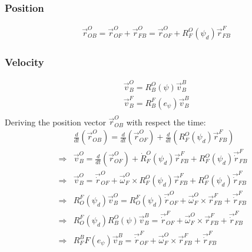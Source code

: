 \documentclass[12pt]{article}
\begin{document}
            
        \subsubsection{Position}
            \begin{equation}
                \begin{aligned}
                    & \vec{r}_{OB}^O = \vec{r}_{OF}^O + \vec{r}_{FB}^O = \vec{r}_{OF}^O + R_F^O(\psi_d) \vec{r}_{FB}^F
                \end{aligned}
            \end{equation}


        \subsubsection{Velocity}
            \begin{equation}
                \begin{aligned}
                    & \vec{v}_B^O = R_B^O(\psi) \vec{v}_B^B \\
                    & \vec{v}_B^F = R_B^F(e_{\psi}) \vec{v}_B^B \\
                \end{aligned}
            \end{equation}
            Deriving the position vector $\vec{r}_{OB}^O$ with respect the time: 
            \begin{equation}
                \begin{aligned}
                    & \frac{d}{dt}(\vec{r}_{OB}^O) = \frac{d}{dt}(\vec{r}_{OF}^O) + \frac{d}{dt}(R_F^O(\psi_d) \vec{r}_{FB}^F) \\
                    \Rightarrow & \vec{v}_B^O = \frac{d}{dt}(\vec{r}_{OF}^O) + \dot{R}_F^O(\psi_d) \vec{r}_{FB}^F + R_F^O(\psi_d) \vec{\dot{r}}_{FB}^F \\
                    \Rightarrow & \vec{v}_B^O = \vec{\dot{r}}_{OF}^O + \vec{\omega}_F^O \times R_F^O(\psi_d) \vec{r}_{FB}^F + R_F^O(\psi_d) \vec{\dot{r}}_{FB}^F \\
                    \Rightarrow & R_O^F(\psi_d) \vec{v}_B^O = R_O^F(\psi_d) \vec{\dot{r}}_{OF}^O + \vec{\omega}_F^O \times \vec{r}_{FB}^F + \vec{\dot{r}}_{FB}^F \\
                    \Rightarrow & R_O^F(\psi_d) R_B^O(\psi) \vec{v}_B^B = \vec{\dot{r}}_{OF}^F + \vec{\omega}_F^O \times \vec{r}_{FB}^F + \vec{\dot{r}}_{FB}^F \\
                    \Rightarrow & R_F^BF(e_{\psi}) \vec{v}_B^B = \vec{\dot{r}}_{OF}^F + \vec{\omega}_F^O \times \vec{r}_{FB}^F + \vec{\dot{r}}_{FB}^F \\
                \end{aligned}
            \end{equation}
\end{document}
